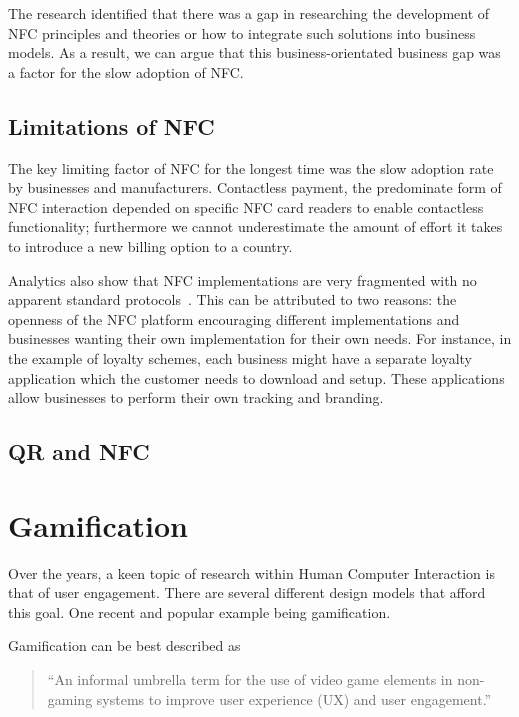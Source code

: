 The research identified that there was a gap in researching the development of NFC principles and theories or how to integrate such solutions into business models. As a result, we can argue that this business-orientated business gap was a factor for the slow adoption of NFC.
\subsection{Limitations of NFC}
The key limiting factor of NFC for the longest time was the slow adoption rate by businesses and manufacturers. Contactless payment, the predominate form of NFC interaction depended on specific NFC card readers to enable contactless functionality; furthermore we cannot underestimate the amount of effort it takes to introduce a new billing option to a country.

Analytics also show that NFC implementations are very fragmented with no apparent standard protocols~\cite{fragmentednfc}. This can be attributed to two reasons: the openness of the NFC platform encouraging different implementations and businesses wanting their own implementation for their own needs. For instance, in the example of loyalty schemes, each business might have a separate loyalty application which the customer needs to download and setup. These applications allow businesses to perform their own tracking and branding.
\subsection{QR and NFC}
\clearpage{}
\section{Gamification}
Over the years, a keen topic of research within Human Computer Interaction is that of user engagement. There are several different design models that afford this goal. One recent and popular example being gamification. 

Gamification can be best described as
\begin{quotation}
\noindent
``An informal umbrella term for the use of video game elements in non-gaming systems to improve user experience (UX) and user engagement.''~\cite[p.~2425]{Deterding:2011:GUG:1979742.1979575}
 \end{quotation}


